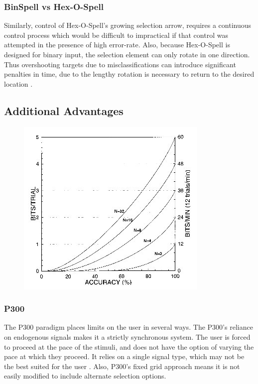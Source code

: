 \documentclass[12pt,titlepage]{article}
\begin{document}
\subsubsection{BinSpell vs Hex-O-Spell}

Similarly, control of Hex-O-Spell's growing selection arrow, requires a continuous control process which would be difficult to impractical if that control was attempted in the presence of high error-rate.  Also, 
because Hex-O-Spell is designed for binary input, the selection element 
can only rotate in one direction.  Thus overshooting targets due to misclassifications can introduce significant penalties 
in time, due to the  lengthy rotation is necessary to return to the desired location \cite{blankertz_advanced}.  


\subsection{Additional Advantages}

\begin{figure}[t]
\begin{center}
	\includegraphics[scale=0.75]{fig12.jpg}
	\label{fig:itrvsacc}
\end{center}
\end{figure}

\subsubsection{P300}

The P300 paradigm places limits on the user in several ways.  The P300's reliance on 
endogenous signals makes it a strictly synchronous system.  The user is forced to proceed at the 
pace of the stimuli, and does not have the option of varying the pace at which they proceed.  It 
relies on a single signal type, which may not be the best suited for the user \cite{wolpaw_braincomputer_2002}.  Also, P300's 
fixed grid approach means it is not easily modified to include alternate selection options.
\end{document}
